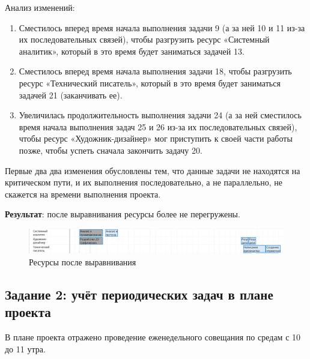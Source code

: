 \newpage

Анализ изменений:

\begin{enumerate}
    \item Сместилось вперед время начала выполнения задачи 9 (а за ней 10 и 11 из-за их последовательных связей), чтобы разгрузить ресурс «Системный аналитик», который в это время будет заниматься задачей 13.
    \item Сместилось вперед время начала выполнения задачи 18, чтобы разгрузить ресурс «Технический писатель», который в это время будет заниматься задачей 21 (заканчивать ее).
    \item Увеличилась продолжительность выполнения задачи 24 (а за ней сместилось время начала выполнения задач 25 и 26 из-за их последовательных связей), чтобы ресурс «Художник-дизайнер» мог приступить к своей части работы позже, чтобы успеть сначала закончить задачу 20.
\end{enumerate}

Первые два два изменения обусловлены тем, что данные задачи не находятся на критическом пути, и их выполнения последовательно, а не параллельно, не скажется на времени выполнения проекта.


\textbf{}

\textbf{Результат}: после выравнивания ресурсы более не перегружены.

\vspace{8pt}

\begin{figure}[h!]
	\begin{center}
		\includegraphics[scale=0.42]{inc/img/p_4.png}
	\end{center}
	\captionsetup{justification=centering}
	\caption{Ресурсы после выравнивания}
	\label{fig:u3}
\end{figure}

\newpage

\subsection*{Задание 2: учёт периодических задач в плане проекта}

В плане проекта отражено проведение еженедельного совещания по
средам с 10 до 11 утра. 

